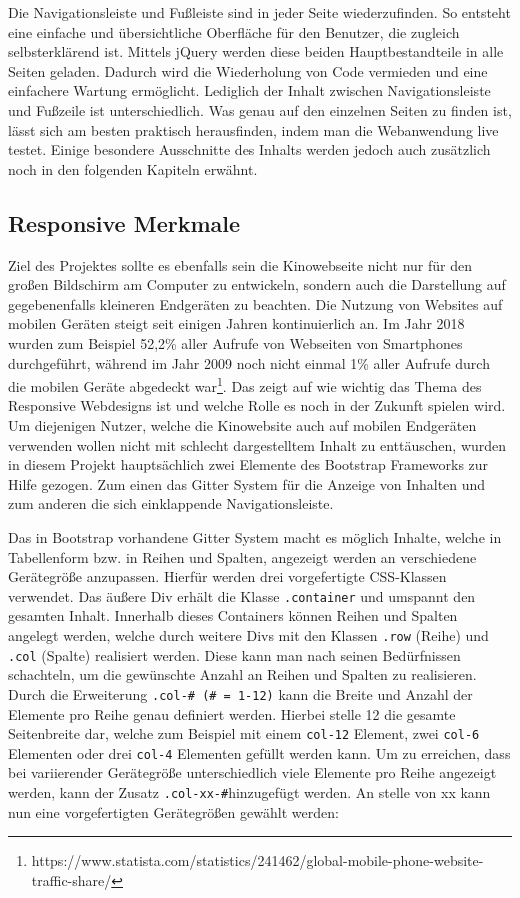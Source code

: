 	    
	    Die Navigationsleiste und Fußleiste sind in jeder Seite wiederzufinden. So entsteht eine einfache und übersichtliche Oberfläche für den Benutzer, die zugleich selbsterklärend ist. Mittels jQuery werden diese beiden Hauptbestandteile in alle Seiten geladen. Dadurch wird die Wiederholung von Code vermieden und eine einfachere Wartung ermöglicht. Lediglich der Inhalt zwischen Navigationsleiste und Fußzeile ist unterschiedlich. Was genau auf den einzelnen Seiten zu finden ist, lässt sich am besten praktisch herausfinden, indem man die Webanwendung live testet. Einige besondere Ausschnitte des Inhalts werden jedoch auch zusätzlich noch in den folgenden Kapiteln erwähnt. 
	
	
	\subsection{Responsive Merkmale}
	Ziel des Projektes sollte es ebenfalls sein die Kinowebseite nicht nur für den großen Bildschirm am Computer zu entwickeln, sondern auch die Darstellung auf gegebenenfalls kleineren Endgeräten zu beachten. Die Nutzung von Websites auf mobilen Geräten steigt seit einigen Jahren kontinuierlich an. Im Jahr 2018 wurden zum Beispiel 52,2\% aller Aufrufe von Webseiten von Smartphones durchgeführt, während im Jahr 2009 noch nicht einmal 1\% aller Aufrufe durch die mobilen Geräte abgedeckt war\footnote{https://www.statista.com/statistics/241462/global-mobile-phone-website-traffic-share/}. Das zeigt auf wie wichtig das Thema des Responsive Webdesigns ist und welche Rolle es noch in der Zukunft spielen wird. Um diejenigen Nutzer, welche die Kinowebsite auch auf mobilen Endgeräten verwenden wollen nicht mit schlecht dargestelltem Inhalt zu enttäuschen, wurden in diesem Projekt hauptsächlich zwei Elemente des Bootstrap Frameworks zur Hilfe gezogen. Zum einen das Gitter System für die Anzeige von Inhalten und zum anderen die sich einklappende Navigationsleiste.
	
	Das in Bootstrap vorhandene Gitter System macht es möglich Inhalte, welche in Tabellenform bzw. in Reihen und Spalten, angezeigt werden an verschiedene Gerätegröße anzupassen. Hierfür werden drei vorgefertigte \acs{CSS}-Klassen verwendet. Das äußere Div erhält die Klasse \texttt{.container} und umspannt den gesamten Inhalt. Innerhalb dieses Containers können Reihen und Spalten angelegt werden, welche durch weitere Divs mit den Klassen \texttt{.row} (Reihe) und \texttt{.col} (Spalte) realisiert werden. Diese kann man nach seinen Bedürfnissen schachteln, um die gewünschte Anzahl an Reihen und Spalten zu realisieren. Durch die Erweiterung \texttt{.col-\# (\# = 1-12)} kann die Breite und Anzahl der Elemente pro Reihe genau definiert werden. Hierbei stelle 12 die gesamte Seitenbreite dar, welche zum Beispiel mit einem 
	\texttt{col-12}  Element, zwei \texttt{col-6} Elementen oder drei \texttt{col-4} Elementen gefüllt werden kann. Um zu erreichen, dass bei variierender Gerätegröße unterschiedlich viele Elemente pro Reihe angezeigt werden, kann der Zusatz \texttt{.col-xx-\#}hinzugefügt werden. An stelle von xx kann nun eine vorgefertigten Gerätegrößen gewählt werden:
	
